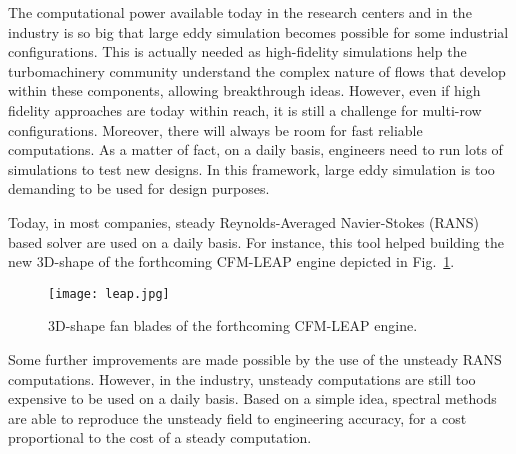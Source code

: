 
The computational power available today in
the research centers and in the industry
is so big that large eddy simulation
becomes possible for some industrial configurations.
This is actually needed as high-fidelity
simulations help the turbomachinery community understand
the complex nature of flows that develop 
within these components,
allowing breakthrough ideas.
However, even if high fidelity approaches
are today within reach, it is still a challenge for
multi-row configurations.
Moreover, there will always be room for fast reliable
computations. 
As a matter of fact, on a daily basis, engineers need
to run lots of simulations to test new designs.
In this framework, large eddy simulation is
too demanding to be used for design purposes.

Today, in most companies, steady Reynolds-Averaged
Navier-Stokes (RANS) based solver are used on a daily basis.
For instance, this tool 
helped building the new $3$D-shape
of the forthcoming CFM-LEAP engine
depicted in Fig.~\ref{fig:sm_leap}.
\begin{figure}[htbp]
  \centering
  \texttt{[image: leap.jpg]}
  \caption{$3$D-shape fan blades of the forthcoming CFM-LEAP engine.}
  \label{fig:sm_leap}
\end{figure}
Some further improvements are made possible by the use
of the unsteady RANS computations.
However, in the industry, unsteady computations
are still too expensive to be used on a daily basis.
Based on a simple idea, spectral methods are 
able to reproduce the unsteady field to engineering
accuracy, for a cost proportional to the cost of a
steady computation.

